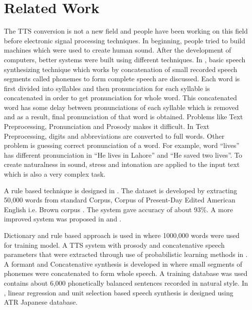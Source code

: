 \chapter{Related Work}

The TTS conversion is not a new field and people have been working on this field before electronic
signal processing techniques. In beginning, people tried to build machines which were used to
create human sound. After the development of computers, better systems were built using different
techniques. In \cite{swetha2013text}, basic speech synthesizing technique
which works by concatenation of small recorded speech segments called phonemes to form
complete speech are discussed. Each word is first divided into syllables and then pronunciation for each syllable
is concatenated in order to get pronunciation for whole word. This concatenated word has some
delay between pronunciations of each syllable which is removed and as a result, final
pronunciation of that word is obtained. Problems like Text Preprocessing, Pronunciation and
Prosody makes it difficult. In Text Preprocessing, digits and abbreviations are converted to full
words. Other problem is guessing correct pronunciation of a word. For example, word “lives” has
different pronunciation in “He lives in Lahore” and “He saved two lives”. To create naturalness in
sound, stress and intonation are applied to the input text which is also a very complex task.


A rule based technique is designed in \cite{elovitz1976automatic}. The dataset is developed by extracting
50,000 words from standard Corpus, Corpus of Present-Day Edited American English i.e. Brown
corpus \cite{ku1967computational}. The system gave accuracy of about 93\%. A more
improved system was proposed in \cite{carlson1982multi} and \cite{klatt1982klattalk}.


Dictionary and rule based approach is used in \cite{liberman1992text} where 1000,000 words were used for training model. A TTS system with
prosody and concatenative speech parameters that were extracted through use of probabilistic
learning methods in \cite{huang1996whistler}. A formant and Concatenative synthesis is developed in \cite{huang1997recent}
where small segments of phonemes were concatenated to form whole speech. A training database
was used contains about 6,000 phonetically balanced sentences recorded in natural style. In \cite{hunt1996unit}, linear regression and unit selection 
based speech synthesis is designed using ATR Japanese database.


